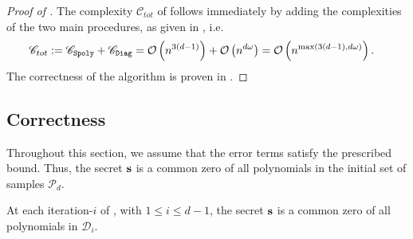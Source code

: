 
\begin{proof}[Proof of ]
    The complexity $\mathscr{C}_{tot}$ of  follows immediately by adding the complexities of the two main procedures, as given in , i.e.
    \begin{align*}
        \mathscr{C}_{tot} &:= \mathscr{C}_{\texttt{Spoly}} + \mathscr{C}_{\texttt{Diag}} = \mathcal{O}\left( n^{3(d-1)} \right) + \mathcal{O}\left(n^{d\omega}\right) = \mathcal{O}\left(n^{\max(3(d-1), d\omega)}\right).
    \end{align*}
    The correctness of the algorithm is proven in .
\end{proof}




\subsection{Correctness}\label{sec:correct}

Throughout this section, we assume that the error terms satisfy the prescribed bound. Thus, the secret $\mathbf{s}$ is a common zero of all polynomials in the initial set of samples $\mathcal{P}_d$.

\begin{proposition}\label{prop:preservation}
At each iteration-$i$ of , with $1 \le i \le d-1$, the secret $\mathbf{s}$ is a common zero of all polynomials in $\mathcal{D}_i$.
\end{proposition}

